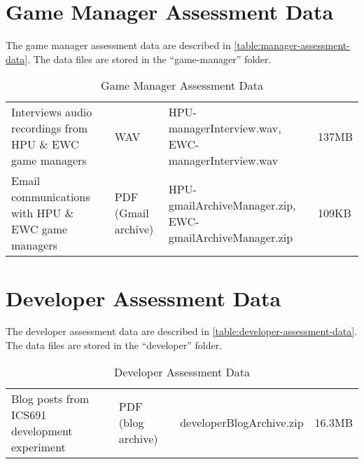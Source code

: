 \section{Game Manager Assessment Data}

The game manager assessment data are described in \autoref{table:manager-assessment-data}. The data files are stored in the ``game-manager'' folder.

\begin{table}[ht!]
  \centering
  \begin{tabular}{|P{0.32\columnwidth}|P{0.15\columnwidth}|p{0.3\columnwidth}|p{0.08\columnwidth}|}
    \hline
     &
      & 
     & 
     \\
    \hline
    Interviews audio recordings from HPU \& EWC game managers & WAV & 
    	HPU-managerInterview.wav, \newline
	EWC-managerInterview.wav & 137MB\\
    \hline
    Email communications with HPU \& EWC game managers & PDF (Gmail archive) & 
    	HPU-gmailArchiveManager.zip, \newline 
	EWC-gmailArchiveManager.zip & 109KB \\
    \hline
  \end{tabular}
  \caption{Game Manager Assessment Data}
  \label{table:manager-assessment-data}
\end{table}

\section{Developer Assessment Data}

The developer assessment data are described in \autoref{table:developer-assessment-data}. The data files are stored in the ``developer'' folder.

\begin{table}[ht!]
  \centering
  \begin{tabular}{|p{}|P{0.2\columnwidth}|p{0.28\columnwidth}|p{0.08\columnwidth}|}
    \hline
     &
      & 
     & 
     \\
    \hline
    Blog posts from ICS691 development experiment & PDF (blog archive) & 
    	developerBlogArchive.zip & 16.3MB\\
    \hline
  \end{tabular}
  \caption{Developer Assessment Data}
  \label{table:developer-assessment-data}
\end{table}

